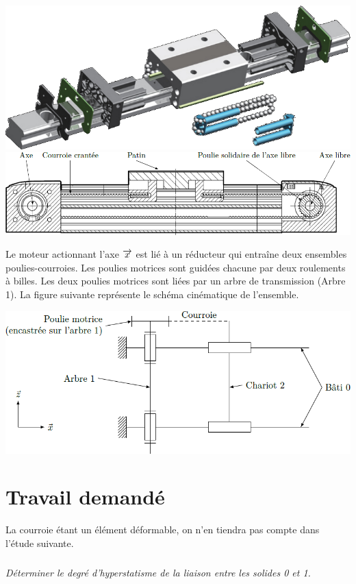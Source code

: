 \documentclass[10pt,fleqn]{article} %
\begin{document}
\begin{multicols}{2}
\begin{center}
\includegraphics[width=.8\linewidth]{images/fig_03}
\includegraphics[width=\linewidth]{images/fig_04}
\end{center}

Le moteur actionnant l’axe $\overrightarrow{x}$ est lié à un réducteur qui entraîne deux ensembles poulies-courroies. Les poulies motrices sont guidées chacune par deux roulements à billes. Les deux poulies motrices sont liées par un arbre de transmission (Arbre 1). La
figure suivante représente le schéma cinématique de l’ensemble.

\begin{center}
\includegraphics[width=\linewidth]{images/fig_05}
\end{center}



\section*{Travail demandé}
La courroie étant un élément déformable, on n’en tiendra pas compte dans l’étude suivante.

\subparagraph{}\textit{Déterminer le degré d’hyperstatisme de la liaison entre les solides 0 et 1.}
\ifprof
\begin{corrige} ~\\


\end{corrige}
\end{multicols}
\end{document}
